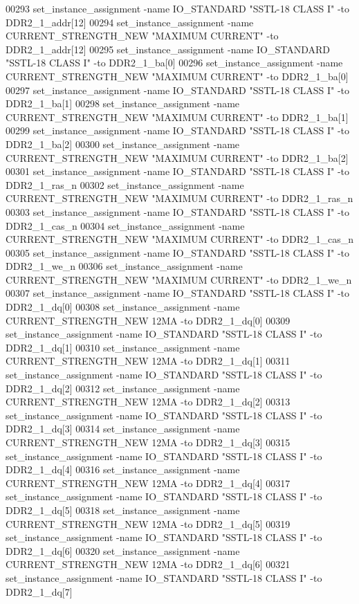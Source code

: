 \begin{DoxyCode}
00293 set\_instance\_assignment -name IO\_STANDARD "SSTL-18 CLASS I" -to DDR2\_1\_addr[12]
00294 set\_instance\_assignment -name CURRENT\_STRENGTH\_NEW "MAXIMUM CURRENT" -to DDR2\_1\_addr[12]
00295 set\_instance\_assignment -name IO\_STANDARD "SSTL-18 CLASS I" -to DDR2\_1\_ba[0]
00296 set\_instance\_assignment -name CURRENT\_STRENGTH\_NEW "MAXIMUM CURRENT" -to DDR2\_1\_ba[0]
00297 set\_instance\_assignment -name IO\_STANDARD "SSTL-18 CLASS I" -to DDR2\_1\_ba[1]
00298 set\_instance\_assignment -name CURRENT\_STRENGTH\_NEW "MAXIMUM CURRENT" -to DDR2\_1\_ba[1]
00299 set\_instance\_assignment -name IO\_STANDARD "SSTL-18 CLASS I" -to DDR2\_1\_ba[2]
00300 set\_instance\_assignment -name CURRENT\_STRENGTH\_NEW "MAXIMUM CURRENT" -to DDR2\_1\_ba[2]
00301 set\_instance\_assignment -name IO\_STANDARD "SSTL-18 CLASS I" -to DDR2\_1\_ras\_n
00302 set\_instance\_assignment -name CURRENT\_STRENGTH\_NEW "MAXIMUM CURRENT" -to DDR2\_1\_ras\_n
00303 set\_instance\_assignment -name IO\_STANDARD "SSTL-18 CLASS I" -to DDR2\_1\_cas\_n
00304 set\_instance\_assignment -name CURRENT\_STRENGTH\_NEW "MAXIMUM CURRENT" -to DDR2\_1\_cas\_n
00305 set\_instance\_assignment -name IO\_STANDARD "SSTL-18 CLASS I" -to DDR2\_1\_we\_n
00306 set\_instance\_assignment -name CURRENT\_STRENGTH\_NEW "MAXIMUM CURRENT" -to DDR2\_1\_we\_n
00307 set\_instance\_assignment -name IO\_STANDARD "SSTL-18 CLASS I" -to DDR2\_1\_dq[0]
00308 set\_instance\_assignment -name CURRENT\_STRENGTH\_NEW 12MA -to DDR2\_1\_dq[0]
00309 set\_instance\_assignment -name IO\_STANDARD "SSTL-18 CLASS I" -to DDR2\_1\_dq[1]
00310 set\_instance\_assignment -name CURRENT\_STRENGTH\_NEW 12MA -to DDR2\_1\_dq[1]
00311 set\_instance\_assignment -name IO\_STANDARD "SSTL-18 CLASS I" -to DDR2\_1\_dq[2]
00312 set\_instance\_assignment -name CURRENT\_STRENGTH\_NEW 12MA -to DDR2\_1\_dq[2]
00313 set\_instance\_assignment -name IO\_STANDARD "SSTL-18 CLASS I" -to DDR2\_1\_dq[3]
00314 set\_instance\_assignment -name CURRENT\_STRENGTH\_NEW 12MA -to DDR2\_1\_dq[3]
00315 set\_instance\_assignment -name IO\_STANDARD "SSTL-18 CLASS I" -to DDR2\_1\_dq[4]
00316 set\_instance\_assignment -name CURRENT\_STRENGTH\_NEW 12MA -to DDR2\_1\_dq[4]
00317 set\_instance\_assignment -name IO\_STANDARD "SSTL-18 CLASS I" -to DDR2\_1\_dq[5]
00318 set\_instance\_assignment -name CURRENT\_STRENGTH\_NEW 12MA -to DDR2\_1\_dq[5]
00319 set\_instance\_assignment -name IO\_STANDARD "SSTL-18 CLASS I" -to DDR2\_1\_dq[6]
00320 set\_instance\_assignment -name CURRENT\_STRENGTH\_NEW 12MA -to DDR2\_1\_dq[6]
00321 set\_instance\_assignment -name IO\_STANDARD "SSTL-18 CLASS I" -to DDR2\_1\_dq[7]

\end{DoxyCode}
